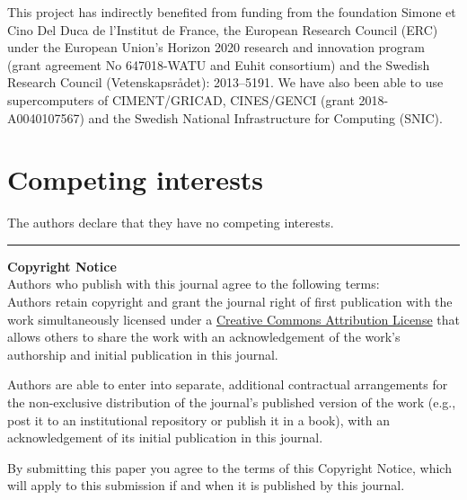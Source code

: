 \documentclass{../jors}
\begin{document}

This project has indirectly benefited from funding from the foundation Simone et
Cino Del Duca de l'Institut de France, the European Research Council (ERC)
under the European Union's Horizon 2020 research and innovation program (grant
agreement No 647018-WATU and Euhit consortium) and the Swedish Research Council
(Vetenskapsr{\aa}det): 2013--5191.
%
We have also been able to use supercomputers of CIMENT/GRICAD, CINES/GENCI
(grant 2018-A0040107567) and the Swedish National Infrastructure for Computing
(SNIC).

\section*{Competing interests}


The authors declare that they have no competing interests.






\rule{\textwidth}{1pt}

{\bf Copyright Notice} \\
Authors who publish with this journal agree to the following terms: \\

Authors retain copyright and grant the journal right of first publication with
the work simultaneously licensed under a
\href{http://creativecommons.org/licenses/by/3.0/}{Creative Commons Attribution
License} that allows others to share the work with an acknowledgement of the
work's authorship and initial publication in this journal.

Authors are able to enter into separate, additional contractual arrangements
for the non-exclusive distribution of the journal's published version of the
work (e.g., post it to an institutional repository or publish it in a book),
with an acknowledgement of its initial publication in this journal.

By submitting this paper you agree to the terms of this Copyright Notice, which
will apply to this submission if and when it is published by this journal.
\end{document}
